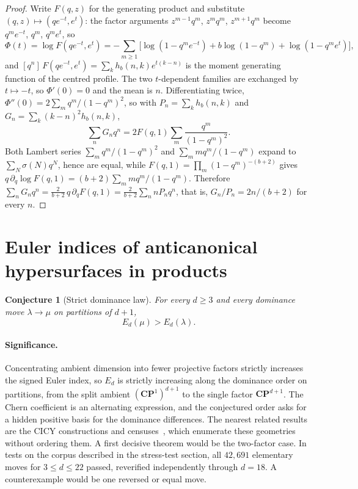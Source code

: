 \documentclass[11pt]{article}
\newtheorem{conjecture}{Conjecture}
\theoremstyle{definition}
\begin{document}
\begin{proof}
Write $F(q,z)$ for the generating product and substitute $(q,z)\mapsto(qe^{-t},e^t)$: the factor arguments $z^{m-1}q^m$, $z^mq^m$, $z^{m+1}q^m$ become $q^me^{-t}$, $q^m$, $q^me^t$, so
\[
\Phi(t)=\log F(qe^{-t},e^t)
=-\sum_{m\ge1}\bigl[\log(1-q^me^{-t})+b\log(1-q^m)+\log(1-q^me^t)\bigr],
\]
and $[q^n]\,F(qe^{-t},e^t)=\sum_kh_b(n,k)e^{t(k-n)}$ is the moment generating function of the centred profile.  The two $t$-dependent families are exchanged by $t\mapsto-t$, so $\Phi'(0)=0$ and the mean is $n$.  Differentiating twice, $\Phi''(0)=2\sum_mq^m/(1-q^m)^2$, so with $P_n=\sum_kh_b(n,k)$ and $G_n=\sum_k(k-n)^2h_b(n,k)$,
\[
\sum_nG_nq^n=2F(q,1)\sum_m\frac{q^m}{(1-q^m)^2}.
\]
Both Lambert series $\sum_mq^m/(1-q^m)^2$ and $\sum_mmq^m/(1-q^m)$ expand to $\sum_N\sigma(N)q^N$, hence are equal, while $F(q,1)=\prod_m(1-q^m)^{-(b+2)}$ gives $q\,\partial_q\log F(q,1)=(b+2)\sum_mmq^m/(1-q^m)$.  Therefore $\sum_nG_nq^n=\tfrac2{b+2}\,q\,\partial_qF(q,1)=\tfrac2{b+2}\sum_nnP_nq^n$, that is, $G_n/P_n=2n/(b+2)$ for every $n$.
\end{proof}

\section{Euler indices of anticanonical hypersurfaces in products}

\begin{conjecture}[Strict dominance law]\label{y1}
For every $d\ge3$ and every dominance move $\lambda\to\mu$ on partitions of $d+1$,
\[
E_d(\mu)>E_d(\lambda).
\]
\end{conjecture}

\paragraph{Significance.}
Concentrating ambient dimension into fewer projective factors strictly increases the signed Euler index, so $E_d$ is strictly increasing along the dominance order on partitions, from the split ambient $(\mathbf{CP}^1)^{d+1}$ to the single factor $\mathbf{CP}^{d+1}$.  The Chern coefficient is an alternating expression, and the conjectured order asks for a hidden positive basis for the dominance differences.  The nearest related results are the CICY constructions and censuses~\cite{He21,AndGCICY}, which enumerate these geometries without ordering them.  A first decisive theorem would be the two-factor case.  In tests on the corpus described in the stress-test section, all $42{,}691$ elementary moves for $3\le d\le22$ passed, reverified independently through $d=18$.  A counterexample would be one reversed or equal move.
\end{document}
